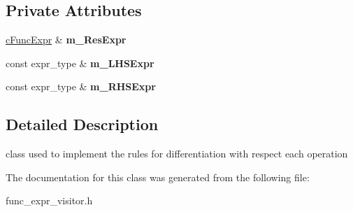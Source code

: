 \subsection*{Private Attributes}
\begin{DoxyCompactItemize}
\item 
\hypertarget{classcExprDiffVisitor_a7d8cba6d4c5d61a91ccf7fdd7e9a820c}{\hyperlink{classcFuncExpr}{c\-Func\-Expr} \& {\bfseries m\-\_\-\-Res\-Expr}}\label{classcExprDiffVisitor_a7d8cba6d4c5d61a91ccf7fdd7e9a820c}

\item 
\hypertarget{classcExprDiffVisitor_aceac3de17c7fe94985bef8534a4b8fb2}{const expr\-\_\-type \& {\bfseries m\-\_\-\-L\-H\-S\-Expr}}\label{classcExprDiffVisitor_aceac3de17c7fe94985bef8534a4b8fb2}

\item 
\hypertarget{classcExprDiffVisitor_a32d17ecf34d93a58e7f6e066f785405b}{const expr\-\_\-type \& {\bfseries m\-\_\-\-R\-H\-S\-Expr}}\label{classcExprDiffVisitor_a32d17ecf34d93a58e7f6e066f785405b}

\end{DoxyCompactItemize}


\subsection{Detailed Description}
class used to implement the rules for differentiation with respect each operation 

The documentation for this class was generated from the following file\-:\begin{DoxyCompactItemize}
\item 
func\-\_\-expr\-\_\-visitor.\-h\end{DoxyCompactItemize}
